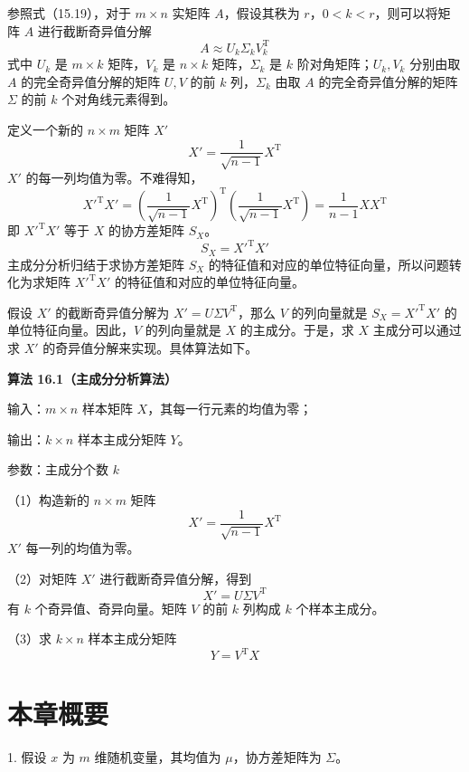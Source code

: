 \documentclass[UTF8,12pt,a4paper,fontset=fandol]{ctexart}
\begin{document}
参照式（15.19），对于 $m\times n$ 实矩阵 $A$，假设其秩为 $r$，$0<k<r$，则可以将矩阵 $A$ 进行截断奇异值分解
\[
A\approx U_k\Sigma_kV_k^{\mathrm{T}}
\]
式中 $U_k$ 是 $m\times k$ 矩阵，$V_k$ 是 $n\times k$ 矩阵，$\Sigma_k$ 是 $k$ 阶对角矩阵；$U_k,V_k$ 分别由取 $A$ 的完全奇异值分解的矩阵 $U,V$ 的前 $k$ 列，$\Sigma_k$ 由取 $A$ 的完全奇异值分解的矩阵 $\Sigma$ 的前 $k$ 个对角线元素得到。

定义一个新的 $n\times m$ 矩阵 $X'$
\begin{equation}
X'=\frac{1}{\sqrt{n-1}}X^{\mathrm{T}}
\tag{16.51}
\end{equation}
$X'$ 的每一列均值为零。不难得知，
\begin{equation}
X'^{\mathrm{T}}X'=
\left(\frac{1}{\sqrt{n-1}}X^{\mathrm{T}}\right)^{\mathrm{T}}
\left(\frac{1}{\sqrt{n-1}}X^{\mathrm{T}}\right)
=\frac{1}{n-1}XX^{\mathrm{T}}
\tag{16.52}
\end{equation}
即 $X'^{\mathrm{T}}X'$ 等于 $X$ 的协方差矩阵 $S_X$。
\begin{equation}
S_X=X'^{\mathrm{T}}X'
\tag{16.53}
\end{equation}
主成分分析归结于求协方差矩阵 $S_X$ 的特征值和对应的单位特征向量，所以问题转化为求矩阵 $X'^{\mathrm{T}}X'$ 的特征值和对应的单位特征向量。

假设 $X'$ 的截断奇异值分解为 $X'=U\Sigma V^{\mathrm{T}}$，那么 $V$ 的列向量就是 $S_X=X'^{\mathrm{T}}X'$ 的单位特征向量。因此，$V$ 的列向量就是 $X$ 的主成分。于是，求 $X$ 主成分可以通过求 $X'$ 的奇异值分解来实现。具体算法如下。

\noindent\textbf{算法 16.1（主成分分析算法）}

输入：$m\times n$ 样本矩阵 $X$，其每一行元素的均值为零；

输出：$k\times n$ 样本主成分矩阵 $Y$。

参数：主成分个数 $k$

（1）构造新的 $n\times m$ 矩阵
\[
X'=\frac{1}{\sqrt{n-1}}X^{\mathrm{T}}
\]
$X'$ 每一列的均值为零。

（2）对矩阵 $X'$ 进行截断奇异值分解，得到
\[
X'=U\Sigma V^{\mathrm{T}}
\]
有 $k$ 个奇异值、奇异向量。矩阵 $V$ 的前 $k$ 列构成 $k$ 个样本主成分。

（3）求 $k\times n$ 样本主成分矩阵
\[
Y=V^{\mathrm{T}}X
\]

\section*{本章概要}

1. 假设 $x$ 为 $m$ 维随机变量，其均值为 $\mu$，协方差矩阵为 $\Sigma$。
\end{document}
